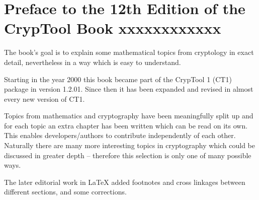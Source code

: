 %

\clearpage{}
{}
\chapter*{Preface to the 12th Edition of the CrypTool Book xxxxxxxxxxxx}

The book's goal is to explain some mathematical topics from cryptology in
exact detail, nevertheless in a way which is easy to understand.

Starting in the year 2000 this book became part of the CrypTool 1
(CT1) package in version 1.2.01. 
Since then it has been expanded and revised in almost every new version of CT1.

Topics from mathematics and cryptography have been meaningfully split up and
for each topic an extra chapter has been written which can be read on its own.
This enables developers/authors to contribute independently of each other.
Naturally there are many more interesting topics in cryptography which could
be discussed in greater depth -- therefore this selection is only one of many
possible ways.

The later editorial work in LaTeX added footnotes and cross linkages between
different sections, and some corrections.

